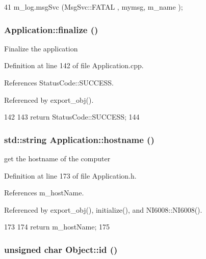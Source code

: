 \begin{DoxyCode}
41 { m_log.msgSvc (MsgSvc::FATAL   , mymsg, m_name ); }
\end{DoxyCode}
\hypertarget{classApplication_a5e2b592eebe6f2f8780d2c129bf14560}{
\subsubsection[{finalize}]{ Application::finalize ()}}
\label{classApplication_a5e2b592eebe6f2f8780d2c129bf14560}
Finalize the application 

Definition at line 142 of file Application.cpp.

References StatusCode::SUCCESS.

Referenced by export\_\-obj().


\begin{DoxyCode}
142                                    {
143   return StatusCode::SUCCESS;
144 }
\end{DoxyCode}
\hypertarget{classApplication_a095248805e26b553466b7fafc6517d8f}{
\subsubsection[{hostname}]{\setlength{\rightskip}{0pt plus 5cm}std::string Application::hostname ()}}
\label{classApplication_a095248805e26b553466b7fafc6517d8f}
get the hostname of the computer 

Definition at line 173 of file Application.h.

References m\_\-hostName.

Referenced by export\_\-obj(), initialize(), and NI6008::NI6008().


\begin{DoxyCode}
173                       {
174     return m_hostName;
175   }
\end{DoxyCode}
\hypertarget{classObject_af99145335cc61ff6e2798ea17db009d2}{
\subsubsection[{id}]{\setlength{\rightskip}{0pt plus 5cm}unsigned char Object::id ()}}
\label{classObject_af99145335cc61ff6e2798ea17db009d2}


